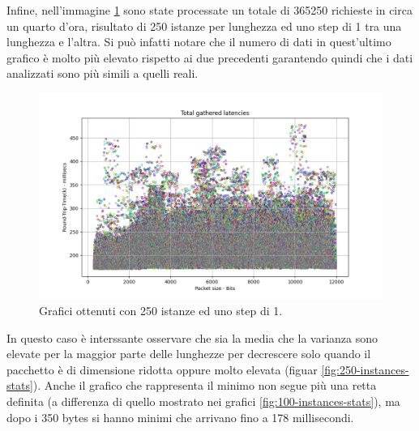 \FloatBarrier\noindent Infine, nell'immagine \ref{fig:250-instances-total} sono state processate un totale di 365250 richieste in circa un quarto d'ora, risultato di 250 istanze per lunghezza ed uno step di 1 tra una lunghezza e l'altra. Si può infatti notare che il numero di dati in quest'ultimo grafico è molto più elevato rispetto ai due precedenti garantendo quindi che i dati analizzati sono più simili a quelli reali.
\begin{figure}[h]
    \centering
    \includegraphics[width = .9\textwidth]{hw-2/report/imgs/250-instances/la-total-latencies.png}
    \caption{Grafici ottenuti con 250 istanze ed uno step di 1.}
    \label{fig:250-instances-total}
\end{figure}
In questo caso è interssante osservare che sia la media che la varianza sono elevate per la maggior parte delle lunghezze per decrescere solo quando il pacchetto è di dimensione ridotta oppure molto elevata (figuar \ref{fig:250-instances-stats}). Anche il grafico che rappresenta il minimo non segue più una retta definita (a differenza di quello mostrato nei grafici \ref{fig:100-instances-stats}), ma dopo i 350 bytes si hanno minimi che arrivano fino a 178 millisecondi.
